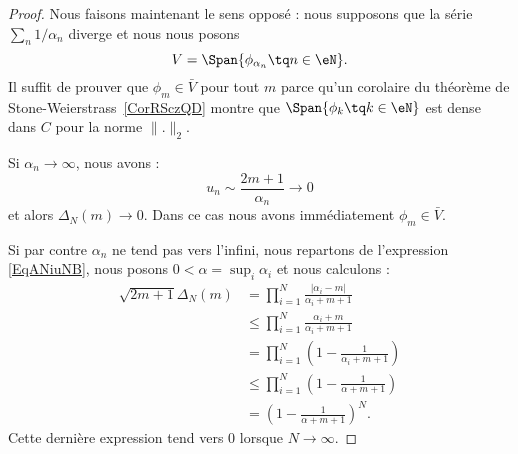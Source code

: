 \begin{proof}
    Nous faisons maintenant le sens opposé : nous supposons que la série \( \sum_n1/\alpha_n\) diverge et nous nous posons
    \begin{equation}
        V=\Span\{ \phi_{\alpha_n}\tq n\in \eN \}.
    \end{equation}
    Il suffit de prouver que \( \phi_m\in \bar V\) pour tout \( m\) parce qu'un corolaire du théorème de Stone-Weierstrass~\ref{CorRSczQD} montre que \( \Span\{ \phi_k\tq k\in \eN \}\) est dense dans \( C\) pour la norme \( \| . \|_2\).

    Si \( \alpha_n\to \infty\), nous avons :
    \begin{equation}
        u_n\sim\frac{ 2m+1 }{ \alpha_n }\to 0
    \end{equation}
    et alors \( \Delta_N(m)\to 0\). Dans ce cas nous avons immédiatement \( \phi_m\in \bar V\).

    Si par contre \( \alpha_n\) ne tend pas vers l'infini, nous repartons de l'expression \eqref{EqANiuNB}, nous posons \( 0<\alpha=\sup_i\alpha_i\) et nous calculons :
    \begin{subequations}
        \begin{align}
            \sqrt{2m+1}\Delta_N(m)&=\prod_{i=1}^N\frac{ | \alpha_i-m | }{ \alpha_i+m+1 }\\
            &\leq \prod_{i=1}^N\frac{ \alpha_i+m }{ \alpha_i+m+1 }\\
            &=\prod_{i=1}^N\left( 1-\frac{ 1 }{ \alpha_i+m+1 } \right)\\
            &\leq \prod_{i=1}^N\left( 1-\frac{1}{ \alpha+m+1 } \right)\\
            &=\left( 1-\frac{1}{ \alpha+m+1 } \right)^N.
        \end{align}
    \end{subequations}
    Cette dernière expression tend vers \( 0\) lorsque \( N\to \infty\).
\end{proof}

